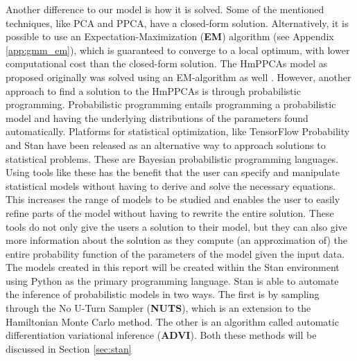 Another difference to our model is how it is solved. Some of the mentioned techniques, like PCA and PPCA, have a closed-form solution. Alternatively, it is possible to use an Expectation-Maximization (\textbf{EM}) algorithm (see Appendix \ref{app:gmm_em}), which is guaranteed to converge to a local optimum, with lower computational cost than the closed-form solution. The HmPPCAs model as proposed originally was solved using an EM-algorithm as well \cite{bishop1998hierarchical, philipsthesis}. However, another approach to find a solution to the HmPPCAs is through probabilistic programming. Probabilistic programming entails programming a probabilistic model and having the underlying distributions of the parameters found automatically. Platforms for statistical optimization, like TensorFlow Probability \cite{dillon2017tensorflow} and Stan \cite{carpenter2017stan} have been released as an alternative way to approach solutions to statistical problems. These are Bayesian probabilistic programming languages. Using tools like these has the benefit that the user can specify and manipulate statistical models without having to derive and solve the necessary equations. This increases the range of models to be studied and enables the user to easily refine parts of the model without having to rewrite the entire solution. These tools do not only give the users a solution to their model, but they can also give more information about the solution as they compute (an approximation of) the entire probability function of the parameters of the model given the input data. The models created in this report will be created within the Stan environment using Python as the primary programming language. Stan is able to automate the inference of probabilistic models in two ways. The first is by sampling through the No U-Turn Sampler (\textbf{NUTS}), which is an extension to the Hamiltonian Monte Carlo method. The other is an algorithm called automatic differentiation variational inference (\textbf{ADVI}). Both these methods will be discussed in Section \ref{sec:stan}


